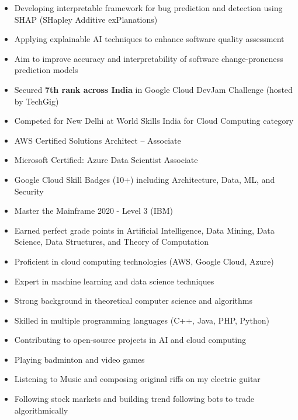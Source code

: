 \documentclass[10pt,a4paper,ragged2e]{altacv}
\begin{document}
\divider

\begin{itemize}
	\item Developing interpretable framework for bug prediction and detection using SHAP (SHapley Additive exPlanations)
	\item Applying explainable AI techniques to enhance software quality assessment
	\item Aim to improve accuracy and interpretability of software change-proneness prediction models
\end{itemize}

\begin{itemize}
	\item Secured \textbf{7th rank across India} in Google Cloud DevJam Challenge (hosted by TechGig)
	\item Competed for New Delhi at World Skills India for Cloud Computing category
	\item AWS Certified Solutions Architect – Associate
	\item Microsoft Certified: Azure Data Scientist Associate
	\item Google Cloud Skill Badges (10+) including Architecture, Data, ML, and Security
	\item Master the Mainframe 2020 - Level 3 (IBM)
	\item Earned perfect grade points in Artificial Intelligence, Data Mining, Data Science, Data Structures, and Theory of Computation
\end{itemize}
\begin{itemize}
	\item Proficient in cloud computing technologies (AWS, Google Cloud, Azure)
	\item Expert in machine learning and data science techniques
	\item Strong background in theoretical computer science and algorithms
	\item Skilled in multiple programming languages (C++, Java, PHP, Python)
	\item Contributing to open-source projects in AI and cloud computing
	\item Playing badminton and video games
	\item Listening to Music and composing original riffs on my electric guitar
	\item Following stock markets and building trend following bots to trade algorithmically
\end{itemize}
\end{document}
